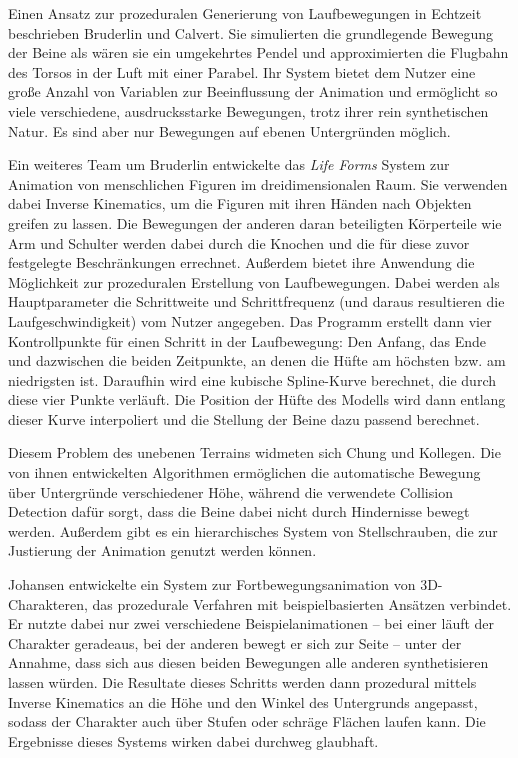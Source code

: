 Einen Ansatz zur prozeduralen Generierung von Laufbewegungen in Echtzeit beschrieben Bruderlin und Calvert\cite{bruderlin1993interactive}\cite{bruderlin1996knowledge}. Sie simulierten die grundlegende Bewegung der Beine als wären sie ein umgekehrtes Pendel und approximierten die Flugbahn des Torsos in der Luft mit einer Parabel. Ihr System bietet dem Nutzer eine große Anzahl von Variablen zur Beeinflussung der Animation und ermöglicht so viele verschiedene, ausdrucksstarke Bewegungen, trotz ihrer rein synthetischen Natur. Es sind aber nur Bewegungen auf ebenen Untergründen möglich.

Ein weiteres Team um Bruderlin\cite{bruderlin1994procedural} entwickelte das \textit{Life Forms} System zur Animation von menschlichen Figuren im dreidimensionalen Raum. Sie verwenden dabei Inverse Kinematics, um die Figuren mit ihren Händen nach Objekten greifen zu lassen. Die Bewegungen der anderen daran beteiligten Körperteile wie Arm und Schulter werden dabei durch die Knochen und die für diese zuvor festgelegte Beschränkungen errechnet. Außerdem bietet ihre Anwendung die Möglichkeit zur prozeduralen Erstellung von Laufbewegungen. Dabei werden als Hauptparameter die Schrittweite und Schrittfrequenz (und daraus resultieren die Laufgeschwindigkeit) vom Nutzer angegeben. Das Programm erstellt dann vier Kontrollpunkte für einen Schritt in der Laufbewegung: Den Anfang, das Ende und dazwischen die beiden Zeitpunkte, an denen die Hüfte am höchsten bzw. am niedrigsten ist. Daraufhin wird eine kubische Spline-Kurve berechnet, die durch diese vier Punkte verläuft. Die Position der Hüfte des Modells wird dann entlang dieser Kurve interpoliert und die Stellung der Beine dazu passend berechnet.

Diesem Problem des unebenen Terrains widmeten sich Chung und Kollegen\cite{chung1999animation}. Die von ihnen entwickelten Algorithmen ermöglichen die automatische Bewegung über Untergründe verschiedener Höhe, während die verwendete Collision Detection dafür sorgt, dass die Beine dabei nicht durch Hindernisse bewegt werden. Außerdem gibt es ein hierarchisches System von Stellschrauben, die zur Justierung der Animation genutzt werden können.

Johansen\cite{johansen2009automated} entwickelte ein System zur Fortbewegungsanimation von 3D-Charakteren, das prozedurale Verfahren mit beispielbasierten Ansätzen verbindet. Er nutzte dabei nur zwei verschiedene Beispielanimationen – bei einer läuft der Charakter geradeaus, bei der anderen bewegt er sich zur Seite – unter der Annahme, dass sich aus diesen beiden Bewegungen alle anderen synthetisieren lassen würden. Die Resultate dieses Schritts werden dann prozedural mittels Inverse Kinematics an die Höhe und den Winkel des Untergrunds angepasst, sodass der Charakter auch über Stufen oder schräge Flächen laufen kann. Die Ergebnisse dieses Systems wirken dabei durchweg glaubhaft.

